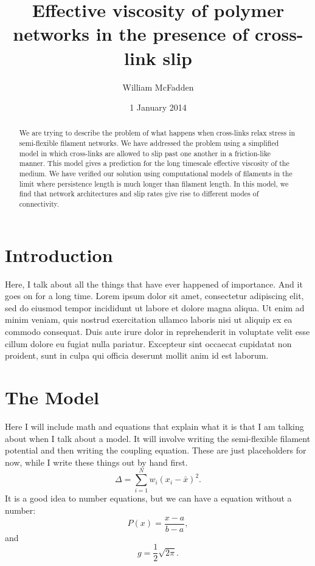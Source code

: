\documentclass[prb,11pt]{revtex4-1}
\begin{document}
\title{Effective viscosity of polymer networks in the presence of cross-link slip}
\author{William McFadden}

\date{1 January 2014}

\begin{abstract}
We are trying to describe the problem of what happens when cross-links relax stress in semi-flexible filament networks.  We have addressed the problem using a simplified model in which cross-links are allowed to slip past one another in a friction-like manner.  This model gives a prediction for the long timescale effective viscosity of the medium.  We have verified our solution using computational models of filaments in the limit where persistence length is much longer than filament length.  In this model, we find that network architectures and slip rates give rise to different modes of connectivity.
\end{abstract}

\maketitle

\section{Introduction}
Here, I talk about all the things that have ever happened of importance. And it goes on for a long time.
Lorem ipsum dolor sit amet, consectetur adipiscing elit, sed do eiusmod tempor incididunt ut labore et dolore magna aliqua. Ut enim ad minim veniam, quis nostrud exercitation ullamco laboris nisi ut aliquip ex ea commodo consequat. Duis aute irure dolor in reprehenderit in voluptate velit esse cillum dolore eu fugiat nulla pariatur. Excepteur sint occaecat cupidatat non proident, sunt in culpa qui officia deserunt mollit anim id est laborum.


\section{The Model}
Here I will include math and equations that explain what it is that I am talking about when I talk about a model.  It will involve writing the semi-flexible filament potential and then writing the coupling equation.  These are just placeholders for now, while I write these things out by hand first.
\begin{equation}
\Delta =\sum_{i=1}^N w_i (x_i - \bar{x})^2.
\end{equation}
It is a good idea to number equations, but we can have a
equation without a number:
\begin{equation}
P(x) = \frac{x - a}{b - a}, \nonumber
\end{equation}
and
\begin{equation}
g = \frac{1}{2} \sqrt{2\pi}. \nonumber
\end{equation}
\end{document}
